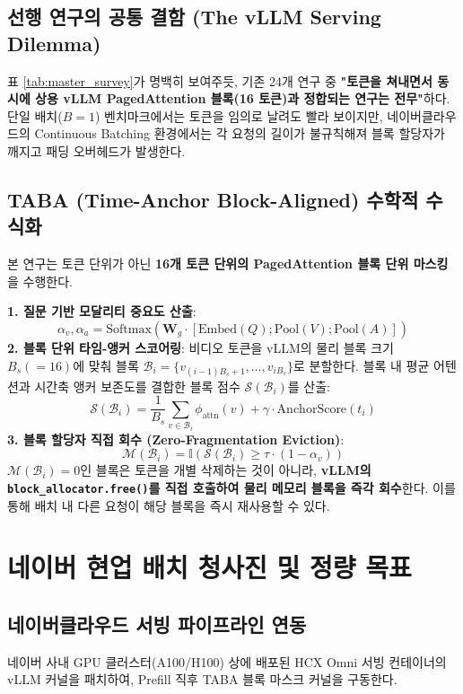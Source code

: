 \documentclass[10pt, a4paper, twocolumn]{article}
\begin{document}
\subsection{선행 연구의 공통 결함 (The vLLM Serving Dilemma)}
표 \ref{tab:master_survey}가 명백히 보여주듯, 기존 24개 연구 중 \textbf{"토큰을 쳐내면서 동시에 상용 vLLM PagedAttention 블록(16 토큰)과 정합되는 연구는 전무"}하다. 단일 배치($B=1$) 벤치마크에서는 토큰을 임의로 날려도 빨라 보이지만, 네이버클라우드의 Continuous Batching 환경에서는 각 요청의 길이가 불규칙해져 블록 할당자가 깨지고 패딩 오버헤드가 발생한다.

\subsection{TABA (Time-Anchor Block-Aligned) 수학적 수식화}
본 연구는 토큰 단위가 아닌 \textbf{16개 토큰 단위의 PagedAttention 블록 단위 마스킹}을 수행한다.

\textbf{1. 질문 기반 모달리티 중요도 산출}:
\begin{equation}
\alpha_v, \alpha_a = \text{Softmax}\left(\mathbf{W}_g \cdot [\text{Embed}(Q); \text{Pool}(V); \text{Pool}(A)]\right)
\end{equation}
\textbf{2. 블록 단위 타임-앵커 스코어링}:
비디오 토큰을 vLLM의 물리 블록 크기 $B_s(=16)$에 맞춰 블록 $\mathcal{B}_i = \{v_{(i-1)B_s + 1}, \dots, v_{i B_s}\}$로 분할한다. 블록 내 평균 어텐션과 시간축 앵커 보존도를 결합한 블록 점수 $\mathcal{S}(\mathcal{B}_i)$를 산출:
\begin{equation}
\mathcal{S}(\mathcal{B}_i) = \frac{1}{B_s} \sum_{v \in \mathcal{B}_i} \phi_{\text{attn}}(v) + \gamma \cdot \text{AnchorScore}(t_i)
\end{equation}
\textbf{3. 블록 할당자 직접 회수 (Zero-Fragmentation Eviction)}:
\begin{equation}
\mathcal{M}(\mathcal{B}_i) = \mathbb{I}\left(\mathcal{S}(\mathcal{B}_i) \ge \tau \cdot (1 - \alpha_v)\right)
\end{equation}
$\mathcal{M}(\mathcal{B}_i) = 0$인 블록은 토큰을 개별 삭제하는 것이 아니라, \textbf{vLLM의 \texttt{block\_allocator.free()}를 직접 호출하여 물리 메모리 블록을 즉각 회수}한다. 이를 통해 배치 내 다른 요청이 해당 블록을 즉시 재사용할 수 있다.

\section{네이버 현업 배치 청사진 및 정량 목표}

\subsection{네이버클라우드 서빙 파이프라인 연동}
네이버 사내 GPU 클러스터(A100/H100) 상에 배포된 HCX Omni 서빙 컨테이너의 vLLM 커널을 패치하여, Prefill 직후 TABA 블록 마스크 커널을 구동한다.
\end{document}
